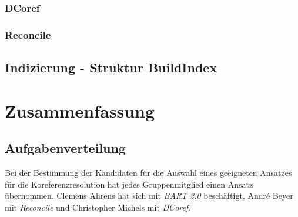 \documentclass[a4paper,12pt,titlepage=true, ngerman]{scrartcl}
\begin{document}

\subsubsection{DCoref}%





\subsubsection{Reconcile}%


\subsection{Indizierung - Struktur BuildIndex}\label{Indizierung}%










\newpage

\section{Zusammenfassung}%



\subsection{Aufgabenverteilung}%

Bei der Bestimmung der Kandidaten für die Auswahl eines geeigneten Ansatzes für die Koreferenzresolution hat jedes Gruppenmitglied einen Ansatz übernommen. Clemens Ahrens hat sich mit \emph{BART 2.0} beschäftigt, André Beyer mit \emph{Reconcile} und Christopher Michels mit \emph{DCoref}.
\end{document}
